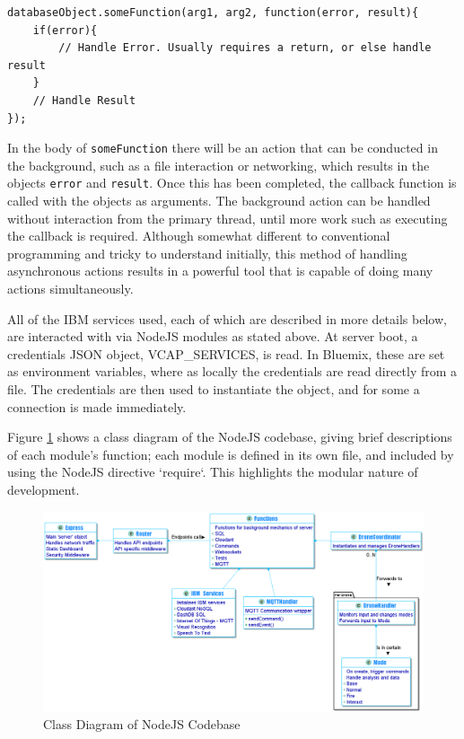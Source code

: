 \documentclass{article}
\begin{document}
\begin{lstlisting}
databaseObject.someFunction(arg1, arg2, function(error, result){
	if(error){
		// Handle Error. Usually requires a return, or else handle result
	}
	// Handle Result
});

\end{lstlisting}  

In the body of \texttt{someFunction} there will be an action that can be conducted in the background, such as a file interaction or networking, which results in the objects \texttt{error} and \texttt{result}. Once this has been completed, the callback function is called with the objects as arguments. The background action can be handled without interaction from the primary thread, until more work such as executing the callback is required. Although somewhat different to conventional programming and tricky to understand initially, this method of handling asynchronous actions results in a powerful tool that is capable of doing many actions simultaneously. 

All of the IBM services used, each of which are described in more details below, are interacted with via NodeJS modules as stated above. At server boot, a credentials JSON object, VCAP\_SERVICES, is read. In Bluemix, these are set as environment variables, where as locally the credentials are read directly from a file. The credentials are then used to instantiate the object, and for some a connection is made immediately.

Figure \ref{fig:ServerDiagram} shows a class diagram of the NodeJS codebase, giving brief descriptions of each module's function; each module is defined in its own file, and included by using the NodeJS directive `require`. This highlights the modular nature of development.  

\begin{landscape}
\begin{figure}
\centering
\caption{Class Diagram of NodeJS Codebase\label{fig:ServerDiagram}}
\includegraphics[width=1.5\textheight]{ServerDiagram}
\end{figure}
\end{landscape}
\end{document}
